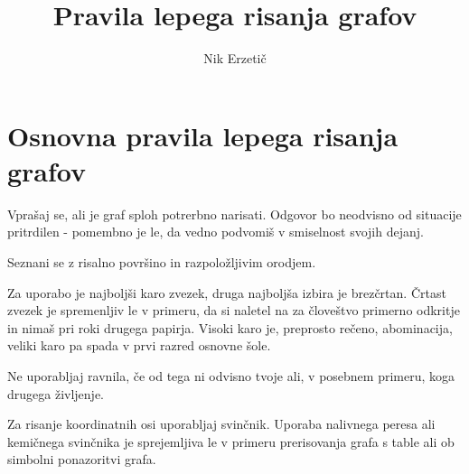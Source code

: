 \documentclass[12pt, a4paper]{book}
\title{Pravila lepega risanja grafov}
\author{Nik Erzetič}
\date{}
\newcounter{pcount}
\begin{document}
	\maketitle
    
    \tableofcontents
    \newpage
    
    \chapter{Osnovna pravila lepega risanja grafov}
    \begin{list}{\textbf{. pravilo lepega risanja grafov:}}{}
    	\item 
    	Vprašaj se, ali je graf sploh potrerbno narisati. Odgovor bo neodvisno od situacije pritrdilen - pomembno je le, da vedno podvomiš v smiselnost svojih dejanj.
        \item
        Seznani se z risalno površino in razpoložljivim orodjem.
        \item
        Za uporabo je najboljši karo zvezek, druga najboljša izbira je brezčrtan. Črtast zvezek je spremenljiv le v primeru, da si naletel na za človeštvo primerno odkritje in nimaš pri roki drugega papirja. Visoki karo je, preprosto rečeno, abominacija, veliki karo pa spada v prvi razred osnovne šole.
        \item
        Ne uporabljaj ravnila, če od tega ni odvisno tvoje ali, v posebnem primeru, koga drugega življenje.
        \item
        Za risanje koordinatnih osi uporabljaj svinčnik. Uporaba nalivnega peresa ali kemičnega svinčnika je sprejemljiva le v primeru prerisovanja grafa  s table ali ob simbolni ponazoritvi grafa.
    \end{list}
\end{document}
